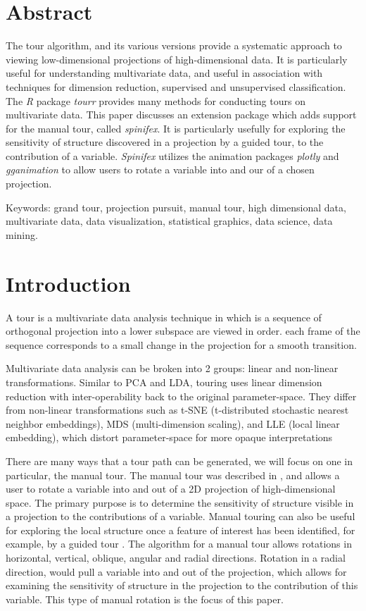 \documentclass{monashthesis}
\begin{document}
\hypertarget{abstract-1}{%
\section{Abstract}\label{abstract-1}}

The tour algorithm, and its various versions provide a systematic approach to viewing low-dimensional projections of high-dimensional data. It is particularly useful for understanding multivariate data, and useful in association with techniques for dimension reduction, supervised and unsupervised classification. The \emph{R} package \emph{tourr} provides many methods for conducting tours on multivariate data. This paper discusses an extension package which adds support for the manual tour, called \emph{spinifex}. It is particularly usefully for exploring the sensitivity of structure discovered in a projection by a guided tour, to the contribution of a variable. \emph{Spinifex} utilizes the animation packages \emph{plotly} and \emph{gganimation} to allow users to rotate a variable into and our of a chosen projection.

Keywords: grand tour, projection pursuit, manual tour, high dimensional data, multivariate data, data visualization, statistical graphics, data science, data mining.

\hypertarget{introduction}{%
\section{Introduction}\label{introduction}}

A tour is a multivariate data analysis technique in which is a sequence of orthogonal projection into a lower subspace are viewed in order. each frame of the sequence corresponds to a small change in the projection for a smooth transition.

Multivariate data analysis can be broken into 2 groups: linear and non-linear transformations. Similar to PCA and LDA, touring uses linear dimension reduction with inter-operability back to the original parameter-space. They differ from non-linear transformations such as t-SNE (t-distributed stochastic nearest neighbor embeddings), MDS (multi-dimension scaling), and LLE (local linear embedding), which distort parameter-space for more opaque interpretations

There are many ways that a tour path can be generated, we will focus on one in particular, the manual tour. The manual tour was described in \textcite{cook_manual_1997}, and allows a user to rotate a variable into and out of a 2D projection of high-dimensional space. The primary purpose is to determine the sensitivity of structure visible in a projection to the contributions of a variable. Manual touring can also be useful for exploring the local structure once a feature of interest has been identified, for example, by a guided tour \autocite{cook_grand_1995}. The algorithm for a manual tour allows rotations in horizontal, vertical, oblique, angular and radial directions. Rotation in a radial direction, would pull a variable into and out of the projection, which allows for examining the sensitivity of structure in the projection to the contribution of this variable. This type of manual rotation is the focus of this paper.
\end{document}
